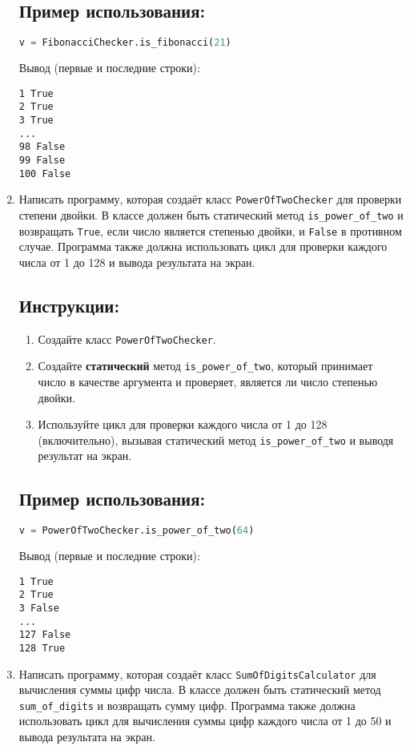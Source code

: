 \begin{enumerate}
\subsection*{Пример использования:}
\begin{lstlisting}[language=Python]
    v = FibonacciChecker.is_fibonacci(21)
\end{lstlisting}
Вывод (первые и последние строки):
\begin{verbatim}
1 True
2 True
3 True
...
98 False
99 False
100 False
\end{verbatim}

\item
Написать программу, которая создаёт класс \texttt{PowerOfTwoChecker} 
для проверки степени двойки. В классе должен быть статический метод
\texttt{is\_power\_of\_two} и возвращать \texttt{True}, если число является степенью двойки, 
и \texttt{False} в противном случае. 
Программа также должна использовать цикл для проверки каждого числа от 
1 до 128 и вывода результата на экран.

\subsection*{Инструкции:}
\begin{enumerate}
    \item Создайте класс \texttt{PowerOfTwoChecker}.
    \item Создайте \textbf{статический} метод \texttt{is\_power\_of\_two}, который принимает число в качестве аргумента и проверяет, является ли число степенью двойки.
    \item Используйте цикл для проверки каждого числа от 1 до 128 (включительно), вызывая статический метод \texttt{is\_power\_of\_two} и выводя результат на экран.
\end{enumerate}

\subsection*{Пример использования:}
\begin{lstlisting}[language=Python]
    v = PowerOfTwoChecker.is_power_of_two(64)
\end{lstlisting}
Вывод (первые и последние строки):
\begin{verbatim}
1 True
2 True
3 False
...
127 False
128 True
\end{verbatim}

\item
Написать программу, которая создаёт класс \texttt{SumOfDigitsCalculator} 
для вычисления суммы цифр числа. В классе должен быть статический метод
\texttt{sum\_of\_digits} и возвращать сумму цифр. 
Программа также должна использовать цикл для вычисления суммы цифр каждого числа от 
1 до 50 и вывода результата на экран.


\end{enumerate}
